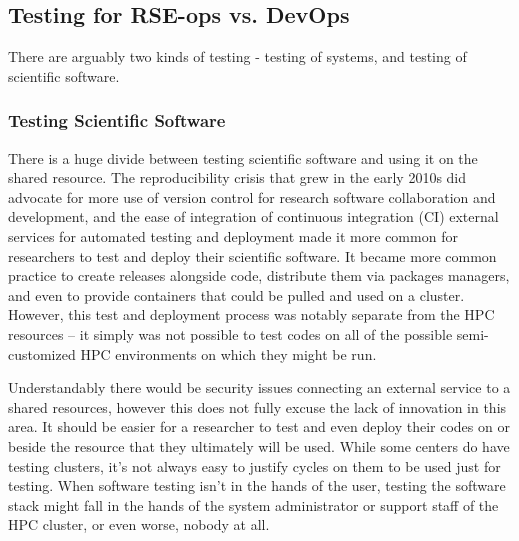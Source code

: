 \subsection{Testing for RSE-ops vs. DevOps}

There are arguably two kinds of testing - testing of systems, and testing of scientific software.

\subsubsection{Testing Scientific Software}

There is a huge divide between testing scientific software and using it on the shared resource. The reproducibility crisis that grew in the early 2010s \cite{replication-crisis} did advocate for more use of version control \cite{github,gitlab} for research software collaboration and development, and the ease of integration of continuous integration (CI) external services for automated testing and deployment \cite{travis,circle,jenkins} made it more common for researchers to test and deploy their scientific software. It became more common practice to create releases alongside code, distribute them via packages managers, and even to provide containers that could be pulled and used on a cluster. However, this test and deployment process was notably separate from the HPC resources -- it simply was not possible to test codes on all of the possible semi-customized HPC environments on which they might be run. 

Understandably there would be security issues connecting an external service to a shared resources, however this does not fully excuse the lack of innovation in this area. It should be easier for a researcher to test and even deploy their codes on or beside the resource that they ultimately will be used. While some centers do have testing clusters, it's not always easy to justify cycles on them to be used just for testing. When software testing isn't in the hands of the user, testing the software stack might fall in the hands of the system administrator or support staff of the HPC cluster, or even worse, nobody at all.

